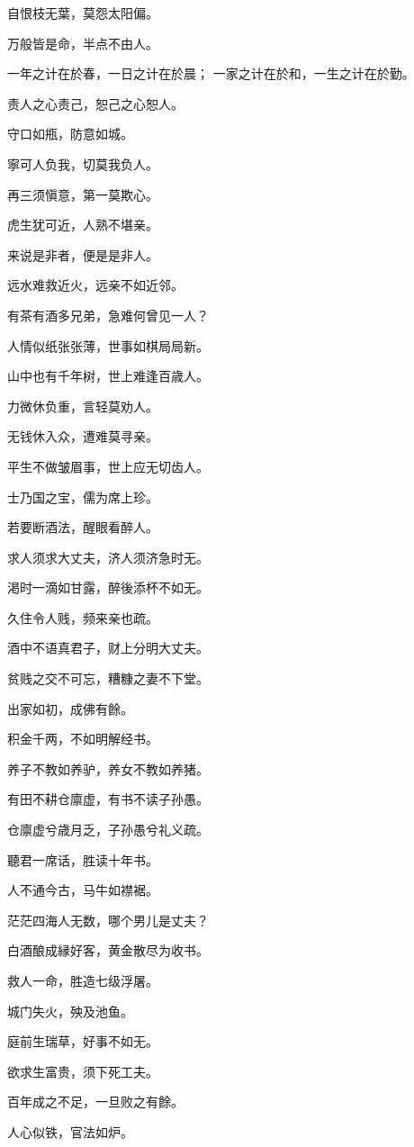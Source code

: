 \documentclass[12pt,oneside]{book}
\begin{document}
自恨枝无葉，莫怨太阳偏。

万般皆是命，半点不由人。

一年之计在於春，一日之计在於晨；
一家之计在於和，一生之计在於勤。

责人之心责己，恕己之心恕人。

守口如甁，防意如城。

寧可人负我，切莫我负人。

再三须愼意，第一莫欺心。

虎生犹可近，人熟不堪亲。

来说是非者，便是是非人。

远水难救近火，远亲不如近邻。

有茶有酒多兄弟，急难何曾见一人？

人情似纸张张薄，世事如棋局局新。

山中也有千年树，世上难逢百歳人。

力微休负重，言轻莫劝人。

无钱休入众，遭难莫寻亲。

平生不做皱眉事，世上应无切齿人。

士乃国之宝，儒为席上珍。

若要断酒法，醒眼看醉人。

求人须求大丈夫，济人须济急时无。

渇时一滴如甘露，醉後添杯不如无。

久住令人贱，频来亲也疏。

酒中不语真君子，财上分明大丈夫。

贫贱之交不可忘，糟糠之妻不下堂。

出家如初，成佛有餘。

积金千两，不如明解经书。

养子不教如养驴，养女不教如养猪。

有田不耕仓廪虚，有书不读子孙愚。

仓廪虚兮歳月乏，子孙愚兮礼义疏。

聽君一席话，胜读十年书。

人不通今古，马牛如襟裾。

茫茫四海人无数，哪个男儿是丈夫？

白酒酿成縁好客，黄金散尽为收书。

救人一命，胜造七级浮屠。

城门失火，殃及池鱼。

庭前生瑞草，好事不如无。

欲求生富贵，须下死工夫。

百年成之不足，一旦败之有餘。

人心似铁，官法如炉。
\end{document}
